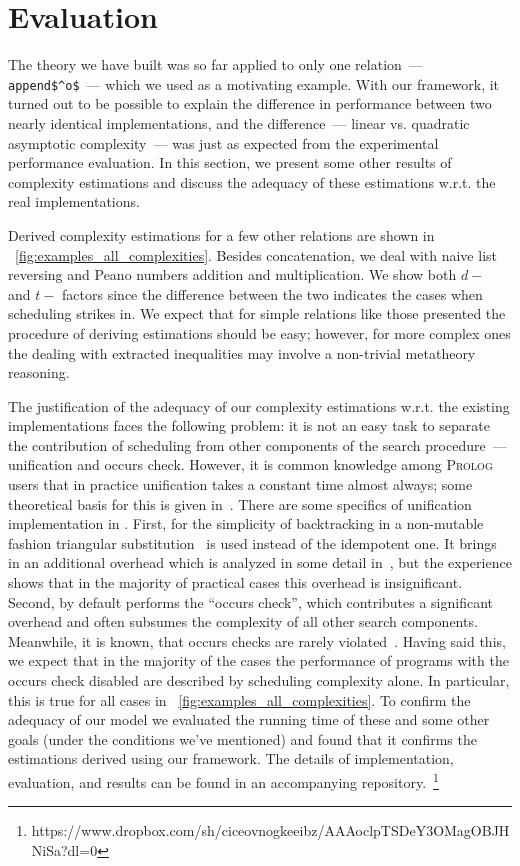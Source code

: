 \section{Evaluation}
\label{sec:evaluation}

The theory we have built was so far applied to only one relation~--- \lstinline|append$^o$|~--- which we used as a motivating example. With our framework, it turned out
to be possible to explain the difference in performance between two nearly identical implementations, and the difference~--- linear vs. quadratic asymptotic
complexity~--- was just as expected from the experimental performance evaluation. In this section, we present some other results of complexity estimations and
discuss the adequacy of these estimations w.r.t. the real \mK implementations.

Derived complexity estimations for a few other relations are shown in \figureword~\ref{fig:examples_all_complexities}. Besides concatenation, we deal with
naive list reversing and Peano numbers addition and multiplication. We show both $d-$ and $t-$ factors since the difference between the two indicates the
cases when scheduling strikes in. We expect that for simple relations like those presented the procedure of deriving estimations should be easy; however,
for more complex ones the dealing with extracted inequalities may involve a non-trivial metatheory reasoning.

The justification of the adequacy of our complexity estimations w.r.t. the existing \mK implementations faces the following problem: it is
not an easy task to separate the contribution of scheduling from other components of the search procedure~--- unification and occurs check. However, it is common
knowledge among \textsc{Prolog} users that in practice unification takes a constant time almost always; some theoretical basis for this is given in~\cite{UnificationAverageCost}.
There are some specifics of unification implementation in \mK. First, for the simplicity of backtracking in a non-mutable fashion triangular
substitution~\cite{UnificationTheory} is used instead of the idempotent one. It brings in an additional overhead which is analyzed
in some detail in~\cite{WillsThesis}, but the experience shows that in the majority of practical cases this overhead is insignificant. Second, \mK by default
performs the ``occurs check'', which contributes a significant overhead and often subsumes the complexity of all other search components. Meanwhile, it is known, that occurs checks are rarely
violated~\cite{OccursCheckNotAProblem}. Having said this, we expect that in the majority of the cases the performance of \mK programs with the occurs check disabled are
described by scheduling complexity alone. In particular, this is true for all cases in \figureword~\ref{fig:examples_all_complexities}. To confirm the adequacy of
our model we evaluated the running time of these and some other goals (under the conditions we've mentioned) and found that it confirms the estimations derived
using our framework. The details of implementation, evaluation, and results can be found in an accompanying repository.~\footnote{https://www.dropbox.com/sh/ciceovnogkeeibz/AAAoclpTSDeY3OMagOBJHNiSa?dl=0}


